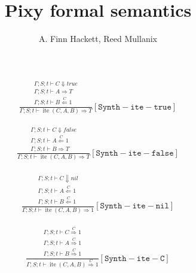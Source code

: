 \documentclass{scrartcl}
\DeclareMathOperator{\ite}{ite}
\begin{document}
    \title{Pixy formal semantics}
    \author{A. Finn Hackett, Reed Mullanix}
    \maketitle
    
    \begin{align*}
    \frac{
        \begin{matrix}
        \Gamma; S; t \vdash C \Downarrow true \\
        \Gamma; S; t \vdash A \Rightarrow T \\
        \Gamma; S; t \vdash B \overset{C}{\Leftarrow} 1
        \end{matrix}
    }{
        \Gamma; S; t \vdash \ite(C,A,B) \Rightarrow T
    }[\mathtt{Synth-ite-true}]
    \end{align*}
    
    \begin{align*}
    \frac{
        \begin{matrix}
        \Gamma; S; t \vdash C \Downarrow false \\
        \Gamma; S; t \vdash A \overset{C}{\Leftarrow} 1 \\
        \Gamma; S; t \vdash B \Rightarrow T
        \end{matrix}
    }{
        \Gamma; S; t \vdash \ite(C,A,B) \Rightarrow T
    }[\mathtt{Synth-ite-false}]
    \end{align*}
    
    \begin{align*}
    \frac{
        \begin{matrix}
        \Gamma; S; t \vdash C \Downarrow nil \\
        \Gamma; S; t \vdash A \overset{C}{\Leftarrow} 1 \\
        \Gamma; S; t \vdash B \overset{C}{\Leftarrow} 1
        \end{matrix}
    }{
        \Gamma; S; t \vdash \ite(C,A,B) \Rightarrow 1
    }[\mathtt{Synth-ite-nil}]
    \end{align*}
    
    \begin{align*}
    \frac{
        \begin{matrix}
        \Gamma; S; t \vdash C \overset{C}{\Rightarrow} 1 \\
        \Gamma; S; t \vdash A \overset{C}{\Rightarrow} 1 \\
        \Gamma; S; t \vdash B \overset{C}{\Rightarrow} 1
        \end{matrix}
    }{
        \Gamma; S; t \vdash \ite(C,A,B) \overset{C}{\Rightarrow} 1
    }[\mathtt{Synth-ite-C}]
    \end{align*}
    
\end{document}

